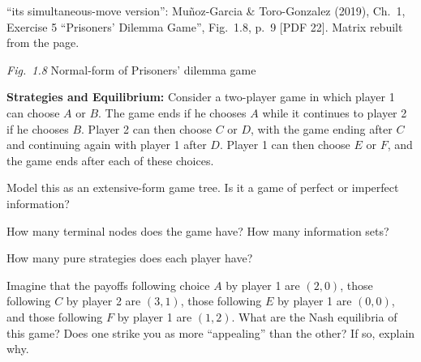 \begin{referencia}{``its simultaneous-move version'': Muñoz-Garcia \& Toro-Gonzalez (2019), Ch.~1,
Exercise 5 ``Prisoners' Dilemma Game'', Fig.~1.8, p.~9 [PDF 22]. Matrix rebuilt from the page.}
\vspace{-6pt}\begin{center}\textit{Fig.~1.8} Normal-form of Prisoners' dilemma game\end{center}
\end{referencia}
\resolespaco


\textbf{Strategies and Equilibrium:} Consider a two-player game in which player 1 can
choose $A$ or $B$. The game ends if he chooses $A$ while it continues to player 2 if he chooses
$B$. Player 2 can then choose $C$ or $D$, with the game ending after $C$ and continuing again with
player 1 after $D$. Player 1 can then choose $E$ or $F$, and the game ends after each of these
choices.
\begin{partes}
\item Model this as an extensive-form game tree. Is it a game of perfect or imperfect information?
\item How many terminal nodes does the game have? How many information sets?
\item How many pure strategies does each player have?
\item Imagine that the payoffs following choice $A$ by player 1 are $(2, 0)$, those following $C$ by
player 2 are $(3, 1)$, those following $E$ by player 1 are $(0, 0)$, and those following $F$ by
player 1 are $(1, 2)$. What are the Nash equilibria of this game? Does one strike you as more
``appealing'' than the other? If so, explain why.
\end{partes}
\resolespaco

